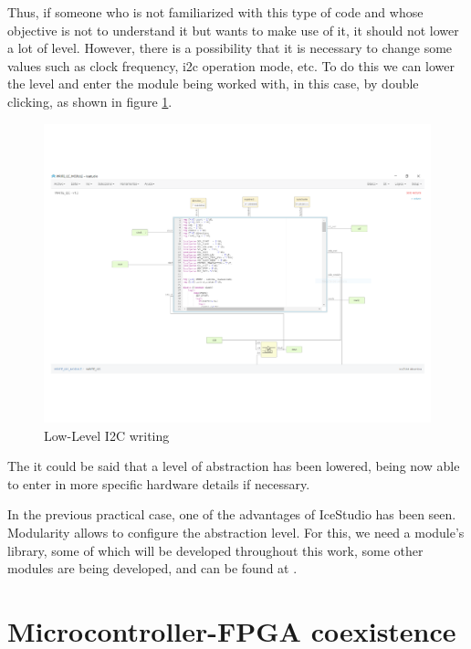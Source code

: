 Thus, if someone who is not familiarized with this type of code and whose objective is not to understand it but wants to make use of it, it should not lower a lot of level.
However, there is a possibility that it is necessary to change some values such as clock frequency, i2c operation mode, etc. To do this we can lower the level and enter the module being worked with, in this case, by double clicking, as shown in figure \ref{fig:Write_i2c_module2}. 

\begin{figure}[H]
	\center
	\includegraphics[trim = 0mm 1.5cm 0mm 0mm, clip,scale=0.4]{imagenes/EstadoArte/Write_i2c_module2.pdf}
	\caption{Low-Level I2C writing}
	\label{fig:Write_i2c_module2}
\end{figure}

The it could be said that a level of abstraction has been lowered, being now able to enter in more specific hardware details if necessary. \newline

In the previous practical case, one of the advantages of IceStudio has been seen. Modularity allows to configure the abstraction level. For this, we need a module’s library, some of which will be developed throughout this work, some other modules are being developed, and can be found at \cite{GoogleGroups}.

\section{Microcontroller-FPGA coexistence}\label{sec:coexistencia}
